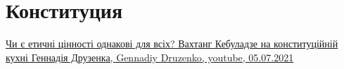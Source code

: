  
 
 
 
 
\chapter{Конституция}

\href{https://www.youtube.com/watch?v=3--6UQ-LR8E}{%
Чи є етичні цінності однакові для всіх? Вахтанг Кебуладзе на конституційній кухні Геннадія Друзенка, %
Gennadiy Druzenko, youtube, 05.07.2021%
}
